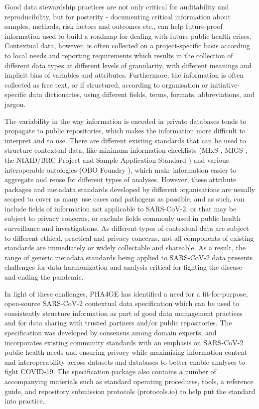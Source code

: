 Good data stewardship practices are not only critical for auditability and reproducibility, but for posterity - documenting critical information about samples, methods, risk factors and outcomes etc., can help future-proof information used to build a roadmap for dealing with future public health crises. Contextual data, however, is often collected on a project-specific basis according to local needs and reporting requirements which results in the collection of different data types at different levels of granularity, with different meanings and implicit bias of variables and attributes. Furthermore, the information is often collected as free text, or if structured, according to organisation or initiative-specific data dictionaries, using different fields, terms, formats, abbreviations, and jargon.

The variability in the way information is encoded in private databases tends to propagate to public repositories, which makes the information more difficult to interpret and to use. There are different existing standards that can be used to structure contextual data, like minimum information checklists (MIxS \cite{yilmaz_minimum_2011}, MIGS \cite{field_minimum_2008}, the NIAID/BRC Project and Sample Application Standard \cite{dugan_standardized_2014}) and various interoperable ontologies (OBO Foundry \cite{smith_obo_2007}), which make information easier to aggregate and reuse for different types of analyses. However, these attribute packages and metadata standards developed by different organisations are usually scoped to cover as many use cases and pathogens as possible, and as such, can include fields of information not applicable to SARS-CoV-2, or that may be subject to privacy concerns, or exclude fields commonly used in public health surveillance and investigations. As different types of contextual data are subject to different ethical, practical and privacy concerns, not all components of existing standards are immediately or widely collectable and shareable. As a result, the range of generic metadata standards being applied to SARS-CoV-2 data presents challenges for data harmonization \cite{schriml_covid-19_2020} and analysis critical for fighting the disease and ending the pandemic. 

In light of these challenges, PHA4GE has identified a need for a fit-for-purpose, open-source SARS-CoV-2 contextual data specification which can be used to consistently structure information as part of good data management practices and for data sharing with trusted partners and/or public repositories. The specification was developed by consensus among domain experts, and incorporates existing community standards with an emphasis on SARS-CoV-2 public health needs and ensuring privacy while maximising information content and interoperability across datasets and databases to better enable analyses to fight COVID-19. The specification package also contains a number of accompanying materials such as standard operating procedures, tools, a reference guide, and repository submission protocols (protocols.io) to help put the standard into practice.  

